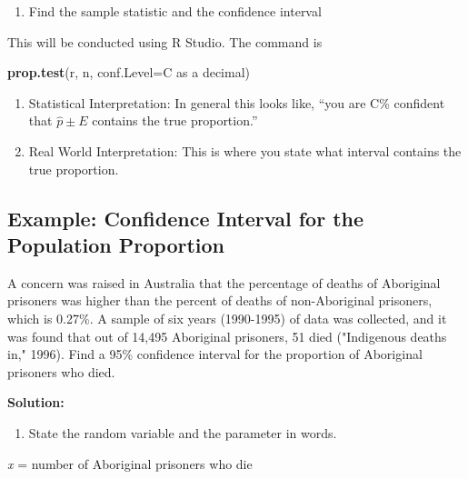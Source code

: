 \documentclass[
]{book}
\newenvironment{Shaded}{\begin{snugshade}}{\end{snugshade}}
\newcommand{\DataTypeTok}[1]{\textcolor[rgb]{0.13,0.29,0.53}{#1}}
\newcommand{\KeywordTok}[1]{\textcolor[rgb]{0.13,0.29,0.53}{\textbf{#1}}}
\newcommand{\NormalTok}[1]{#1}
\providecommand{\tightlist}{%
  \setlength{\itemsep}{0pt}\setlength{\parskip}{0pt}}
\begin{document}
\begin{enumerate}
\def\labelenumi{\arabic{enumi}.}
\setcounter{enumi}{2}
\tightlist
\item
  Find the sample statistic and the confidence interval
\end{enumerate}

This will be conducted using R Studio. The command is

\begin{Shaded}
\begin{Highlighting}[]
\KeywordTok{prop.test}\NormalTok{(r, n, }\DataTypeTok{conf.Level=}\NormalTok{C as a decimal)}
\end{Highlighting}
\end{Shaded}

\begin{enumerate}
\def\labelenumi{\arabic{enumi}.}
\setcounter{enumi}{3}
\item
  Statistical Interpretation: In general this looks like, ``you are C\% confident that \(\hat{p}\pm E\) contains the true proportion.''
\item
  Real World Interpretation: This is where you state what interval contains the true proportion.
\end{enumerate}

\hypertarget{example-confidence-interval-for-the-population-proportion}{%
\subsection{Example: Confidence Interval for the Population Proportion}\label{example-confidence-interval-for-the-population-proportion}}

A concern was raised in Australia that the percentage of deaths of Aboriginal prisoners was higher than the percent of deaths of non-Aboriginal prisoners, which is 0.27\%. A sample of six years (1990-1995) of data was collected, and it was found that out of 14,495 Aboriginal prisoners, 51 died ("Indigenous deaths in," 1996). Find a 95\% confidence interval for the proportion of Aboriginal prisoners who died.

\textbf{Solution:}

\begin{enumerate}
\def\labelenumi{\arabic{enumi}.}
\tightlist
\item
  State the random variable and the parameter in words.
\end{enumerate}

\emph{x} = number of Aboriginal prisoners who die
\end{document}
